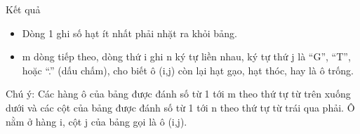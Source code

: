 Kết quả
\begin{itemize}
	\item     Dòng 1 ghi số hạt ít nhất phải nhặt ra khỏi bảng.   
	\item     m dòng tiếp theo, dòng thứ i ghi n ký tự liền nhau, ký tự thứ j là “G”, “T”, hoặc “.” (dấu chấm), cho biết ô (i,j) còn lại hạt gạo, hạt thóc, hay là ô trống.   
\end{itemize}

   Chú ý: Các hàng ô của bảng được đánh số từ 1 tới m theo thứ tự từ trên xuống dưới và các cột của bảng được đánh số từ 1 tới n theo thứ tự từ trái qua phải. Ô nằm ở hàng i, cột j của bảng gọi là ô (i,j).